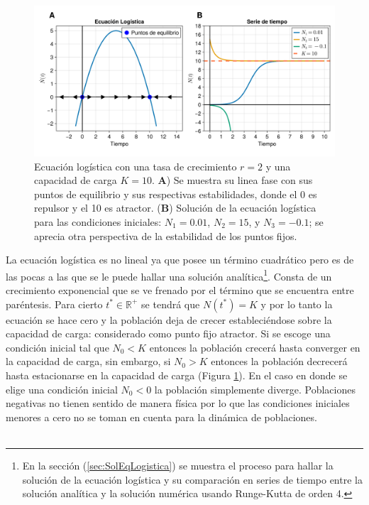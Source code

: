 \begin{figure}[h!]
	\centering
	\includegraphics[scale=0.23]{../Imagenes/Ecuacion Logistica}
	\caption{Ecuación logística con una tasa de crecimiento $r=2$ y una capacidad de carga $K=10$. \textbf{A}) Se muestra su linea fase con sus puntos de equilibrio y sus respectivas estabilidades, donde el 0 es repulsor y el 10 es atractor. (\textbf{B}) Solución de la ecuación logística para las condiciones iniciales: $N_1=0.01$, $N_2=15$, y $N_3=-0.1$; se aprecia otra perspectiva de la estabilidad de los puntos fijos.}
	\label{fig:EcuacionLogistica}
\end{figure}		
La ecuación logística es no lineal ya que posee un término cuadrático pero es de las pocas a las que se le puede hallar una solución analítica\footnote{En la sección (\ref{sec:SolEqLogistica}) se muestra el proceso para hallar la solución de la ecuación logística y su comparación en series de tiempo entre la solución analítica y la solución numérica usando Runge-Kutta de orden 4.}. Consta de un crecimiento exponencial que se ve frenado por el término que se encuentra entre paréntesis. Para cierto $t^*\in\mathbb{R}^+$ se tendrá que $N(t^*)=K$ y por lo tanto la ecuación se hace cero y la población deja de crecer estableciéndose sobre la capacidad de carga: considerado como punto fijo atractor. Si se escoge una condición inicial tal que $N_0<K$ entonces la población crecerá hasta converger en la capacidad de carga,  sin embargo, si $N_0>K$ entonces la población decrecerá hasta estacionarse en la capacidad de carga (Figura \ref{fig:EcuacionLogistica}). En el caso en donde se elige una condición inicial $N_0<0$ la población simplemente diverge. Poblaciones negativas no tienen sentido de manera física por lo que las condiciones iniciales menores a cero no se toman en cuenta para la dinámica de poblaciones. \\
\\
